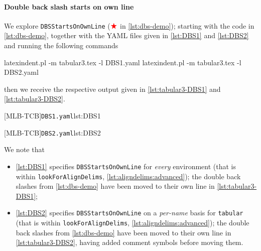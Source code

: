  \paragraph{Double back slash starts on own line}
  \begin{example}
  We explore \texttt{DBSStartsOnOwnLine} ($\color{red}\bigstar$ in \cref{lst:dbs-demo});
  starting with the code in \cref{lst:dbs-demo}, together with the YAML files given in
  \cref{lst:DBS1} and \cref{lst:DBS2} and running the following commands  

  \begin{commandshell}
latexindent.pl -m tabular3.tex -l DBS1.yaml
latexindent.pl -m tabular3.tex -l DBS2.yaml
\end{commandshell}

  then we receive the respective output given in \cref{lst:tabular3-DBS1} and
  \cref{lst:tabular3-DBS2}.

  \begin{cmhtcbraster}
   [MLB-TCB]{\texttt{DBS1.yaml}}{lst:DBS1}
  \end{cmhtcbraster}

  \begin{cmhtcbraster}
   [MLB-TCB]{\texttt{DBS2.yaml}}{lst:DBS2}
  \end{cmhtcbraster}

  We note that
  \begin{itemize}
   \item \cref{lst:DBS1} specifies \texttt{DBSStartsOnOwnLine} for
         \emph{every} environment (that is within \texttt{lookForAlignDelims},
         \vref{lst:aligndelims:advanced});
         the double back slashes from \cref{lst:dbs-demo} have been moved to their own line in
         \cref{lst:tabular3-DBS1};
   \item \cref{lst:DBS2} specifies \texttt{DBSStartsOnOwnLine} on a
         \emph{per-name} basis for \texttt{tabular} (that is within \texttt{lookForAlignDelims},
         \vref{lst:aligndelims:advanced});
         the double back slashes from \cref{lst:dbs-demo} have been moved to their own line in
         \cref{lst:tabular3-DBS2}, having added comment symbols before moving them.
  \end{itemize}
  \end{example}

